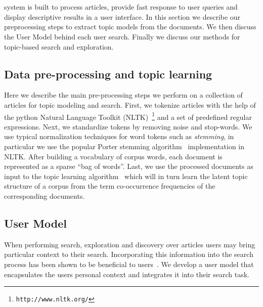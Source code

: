 \section{\system}


{\system} system is built to process articles,
provide fast response to user queries and display descriptive
results in a user interface.
In this section we describe our preprocessing steps to extract
topic models from the documents.
We then discuss the User Model behind each user search.
Finally we discuss our methods for topic-based search and exploration.



\subsection{Data pre-processing and topic learning}

Here we describe the main pre-processing steps we perform on a 
collection of articles for topic modeling and search. First, 
we tokenize articles with the help of the python 
Natural Language Toolkit (NLTK)~\footnote{\texttt{http://www.nltk.org/}} and a set of 
predefined regular expressions. Next, we standardize tokens by 
removing noise and stop-words. We use typical normalization 
techniques for word tokens such as \textsl{stemming}, in particular we use the popular Porter stemming algorithm~\cite{Porter1980} 
implementation in NLTK\@. 
After building a vocabulary of corpus words, each document is represented as a sparse ``bag of words''.
Last, we use the processed documents as input to the topic 
learning algorithm~\cite{hoffman2010online} which will in turn learn 
the latent topic structure of a corpus from the term co-occurrence 
frequencies of the corresponding documents. %



\subsection{User Model}
When performing search, exploration and discovery over articles 
users may bring particular context to their search. Incorporating 
this information into the search process has been shown to be 
beneficial to users~\cite{DZSRWJ,MZPGSOL}. We develop a user model 
that encapsulates the users personal context and integrates it into 
their search task. 


